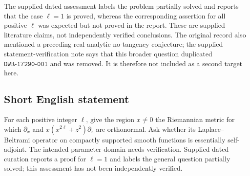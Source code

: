 \documentclass[11pt]{article}
\begin{document}
The supplied dated assessment labels the problem partially solved and reports that the case \(\ell=1\) is proved, whereas the corresponding assertion for all positive \(\ell\) was expected but not proved in the report. These are supplied literature claims, not independently verified conclusions. The original record also mentioned a preceding real-analytic no-tangency conjecture; the supplied statement-verification note says that this broader question duplicated \(\texttt{OWR-17290-001}\) and was removed. It is therefore not included as a second target here.
\subsection{Short English statement}
For each positive integer \(\ell\), give the region \(x\ne0\) the Riemannian metric for which \(\partial_x\) and \(x(x^{2\ell}+z^2)\partial_z\) are orthonormal. Ask whether its Laplace--Beltrami operator on compactly supported smooth functions is essentially self-adjoint. The intended parameter domain needs verification. Supplied dated curation reports a proof for \(\ell=1\) and labels the general question partially solved; this assessment has not been independently verified.
\end{document}
